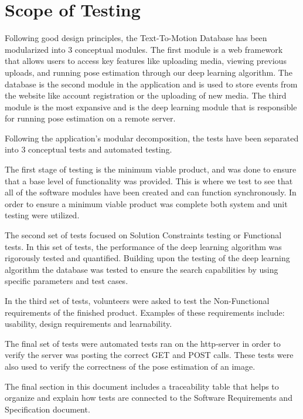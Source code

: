 \documentclass{scrreprt}
\begin{document}
\section{Scope of Testing}

Following good design principles, the Text-To-Motion Database has been modularized into $3$ conceptual modules.  The first module is a web framework that allows users to access key features like uploading media, viewing previous uploads, and running pose estimation through our deep learning algorithm. The database is the second module in the application and is used to store events from the website like account registration or the uploading of new media. The third module is the most expansive and is the deep learning module that is responsible for running pose estimation on a remote server.

Following the application's modular decomposition, the tests have been separated into $3$ conceptual tests and automated testing.

The first stage of testing is the minimum viable product, and was done to ensure that a base level of functionality was provided. This is where we test to see that all of the software modules have been created and can function synchronously. In order to ensure a minimum viable product was complete both system and unit testing were utilized.

The second set of tests focused on Solution Constraints testing or Functional tests.  In this set of tests, the performance of the deep learning algorithm was rigorously tested and quantified. Building upon the testing of the deep learning algorithm the database was tested to ensure the search capabilities by using specific parameters and test cases.

In the third set of tests, volunteers were asked to test the Non-Functional requirements of the finished product. Examples of these requirements include: usability, design requirements and learnability.

The final set of tests were automated tests ran on the http-server in order to verify the server was posting the correct GET and POST calls. These tests were also used to verify the correctness of the pose estimation of an image.

The final section in this document includes a traceability table that helps to organize and explain how tests are connected to the Software Requirements and Specification document.

\end{document}
